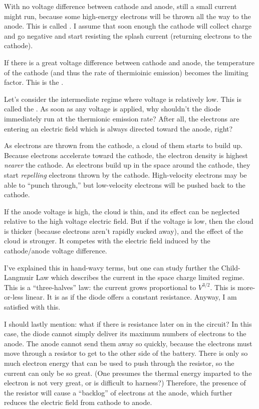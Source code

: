 \documentclass[11pt, oneside]{amsart}
\begin{document}
With no voltage difference between cathode and anode, still a small
current might run, because some high-energy electrons will be thrown all
the way to the anode. This is called . I assume
that soon enough the cathode will collect charge and go negative and
start resisting the splash current (returning electrons to the cathode).

If there is a great voltage difference between cathode and anode, the
temperature of the cathode (and thus the rate of thermioinic emission)
becomes the limiting factor. This is the .

Let's consider the intermediate regime where voltage is relatively low.
This is called the . As soon as any
voltage is applied, why shouldn't the diode immediately run at the
thermionic emission rate? After all, the electrons are entering an
electric field which is always directed toward the anode, right?

As electrons are thrown from the cathode, a cloud of them starts to
build up. Because electrons accelerate toward the cathode, the electron
density is highest \emph{nearer} the cathode. As electrons build up in
the space around the cathode, they start \emph{repelling} electrons
thrown by the cathode. High-velocity electrons may be able to ``punch
through,'' but low-velocity electrons will be pushed back to the
cathode.

If the anode voltage is high, the cloud is thin, and its effect can be
neglected relative to the high voltage electric field. But if the
voltage is low, then the cloud is thicker (because electrons aren't
rapidly sucked away), and the effect of the cloud is stronger. It
competes with the electric field induced by the cathode/anode voltage
difference.

I've explained this in hand-wavy terms, but one can study further the
Child-Langmuir Law which describes the current in the space charge
limited regime. This is a ``three-halves'' law: the current grows
proportional to $V^{3/2}$. This is more-or-less linear. It is as if the
diode offers a constant resistance. Anyway, I am satisfied with this.

I should lastly mention: what if there is resistance later on in the
circuit? In this case, the diode cannot simply deliver its maximum
numbers of electrons to the anode. The anode cannot send them away so
quickly, because the electrons must move through a resistor to get to
the other side of the battery. There is only so much electron energy
that can be used to push through the resistor, so the current can only
be so great. (One presumes the thermal energy imparted to the electron
is not very great, or is difficult to harness?) Therefore, the presence
of the resistor will cause a ``backlog'' of electrons at the anode,
which further reduces the electric field from cathode to anode.
\end{document}
